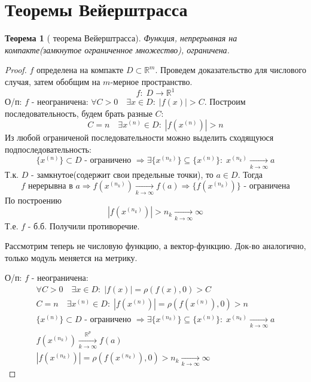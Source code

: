 \newcommand\RRR{\ensuremath{\mathbb{R}}}
\newcommand{\rom}[1]
    {\MakeUppercase{\romannumeral #1}}
\newtheorem{theorem}{Теорема}[section]
\theoremstyle{definition}
\newtheorem{definition}{Определение}[section]
\newpage
\section{Теоремы Вейерштрасса}
    
\begin{theorem}[\rom{1} теорема Вейерштрасса]
    Функция, непрерывная на компакте(замкнутое ограниченное множество), ограничена.
\end{theorem}

\begin{proof}
    $f$ определена на компакте $D \subset \RRR^m$. Проведем доказательство для числового случая, затем обобщим на $m$-мерное пространство.
    \[
        f:\; D \rightarrow \RRR^1
    \]
    О/п: $f$ - неограничена: $\forall C > 0 \quad \exists x \in D:\;|f(x)| > C$. 
    Построим последовательность, будем брать разные $C$:
    \[
        C=n \quad \exists x^{(n)} \in D:\; |f(x^{(n)})| > n
    \]
    Из любой ограниченой последовательности можно выделить сходящуюся подпоследовательность:
    \[
        \{x^{(n)}\} \subset D\text{ - ограничено }\Rightarrow \exists \{ x^{(n_k)} \} \subseteq \{x^{(n)}\}:\; x^{(n_k)} \xrightarrow[k \rightarrow \infty]{} a
    \]
    Т.к. $D$ - замкнутое(содержит свои предельные точки), то $a \in D$. Тогда
    \[
        f \text{ нерерывна в } a \Rightarrow f(x^{(n_k)}) \xrightarrow[k \rightarrow \infty]{} f(a) \Rightarrow \{f(x^{(n_k)})\} \text{ - ограничена} 
    \]
    По построению 
    \[
        |f(x^{(n_k)})| > n_k  \xrightarrow[k \rightarrow \infty]{} \infty
    \]
    Т.е. $f$ - б.б. Получили противоречие. 
        
    Рассмотрим теперь не числовую функцию, а вектор-функцию.
    Док-во аналогично, только модуль меняется на метрику.

    О/п: $f$ - неограничена:
    \begin{gather*}
        \forall C > 0 \quad \exists x \in D:\;|f(x)| = \rho(f(x), 0) > C\\
        C=n \quad \exists x^{(n)} \in D:\; |f(x^{(n)})| = \rho(f(x^{(n)}), 0) > n\\
        \{x^{(n)}\} \subset D\text{ - ограничено }\Rightarrow \exists \{ x^{(n_k)} \} \subseteq \{x^{(n)}\}:\; x^{(n_k)} \xrightarrow[k \rightarrow \infty]{} a\\
        f(x^{(n_k)}) \xrightarrow[k \rightarrow \infty]{\RRR^p} f(a)\\
        |f(x^{(n_k)})| = \rho(f(x^{(n_k)}), 0) > n_k  \xrightarrow[k \rightarrow \infty]{} \infty
    \end{gather*}

\end{proof}

